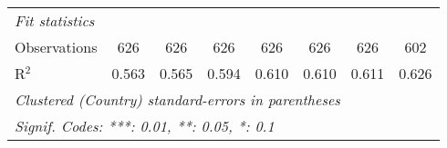 \begin{tabular}{lccccccc}
   \midrule \emph{Fit statistics}\\
   Observations                                                                  & 626     & 626     & 626           & 626           & 626           & 626           & 602\\  
   R$^2$                                                                         & 0.563   & 0.565   & 0.594         & 0.610         & 0.610         & 0.611         & 0.626\\  
   \midrule
   \multicolumn{8}{l}{\emph{Clustered (Country) standard-errors in parentheses}}\\
   \multicolumn{8}{l}{\emph{Signif. Codes: ***: 0.01, **: 0.05, *: 0.1}}\\
\end{tabular}
\par\endgroup


